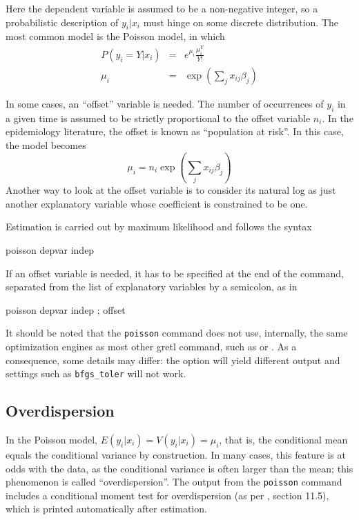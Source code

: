 Here the dependent variable is assumed to be a non-negative integer,
so a probabilistic description of $y_i | x_i$ must hinge on some
discrete distribution. The most common model is the Poisson model, in
which
\begin{eqnarray*}
  P(y_i = Y | x_i) & = & e^{\mu_i} \frac{\mu_i^Y}{Y!} \\
  \mu_i & = & \exp\left( \sum_j x_{ij} \beta_j \right)
\end{eqnarray*}

In some cases, an ``offset'' variable is needed. The number of
occurrences of $y_i$ in a given time is assumed to be strictly
proportional to the offset variable $n_i$. In the epidemiology
literature, the offset is known as ``population at risk''. In this
case, the model becomes
\[
  \mu_i = n_i \exp\left( \sum_j x_{ij} \beta_j \right)
\]
Another way to look at the offset variable is to consider its natural
log as just another explanatory variable whose coefficient is
constrained to be one.

Estimation is carried out by maximum likelihood and follows the syntax
\begin{code}
  poisson depvar indep
\end{code}
If an offset variable is needed, it has to be specified at the end of
the command, separated from the list of explanatory variables by a
semicolon, as in
\begin{code}
  poisson depvar indep ; offset
\end{code}
It should be noted that the \texttt{poisson} command does not use,
internally, the same optimization engines as most other gretl
command, such as  or . As a consequence, some
details may differ: the  option will yield different
output and settings such as \texttt{bfgs\_toler} will not work.

\subsection{Overdispersion}

In the Poisson model, $E(y_i | x_i) = V(y_i | x_i) = \mu_i$, that is,
the conditional mean equals the conditional variance by
construction. In many cases, this feature is at odds with the data, as
the conditional variance is often larger than the mean; this
phenomenon is called ``overdispersion''. The output from the
\texttt{poisson} command includes a conditional moment test for
overdispersion (as per \citet{davidson-mackinnon04}, section 11.5),
which is printed automatically after estimation.

